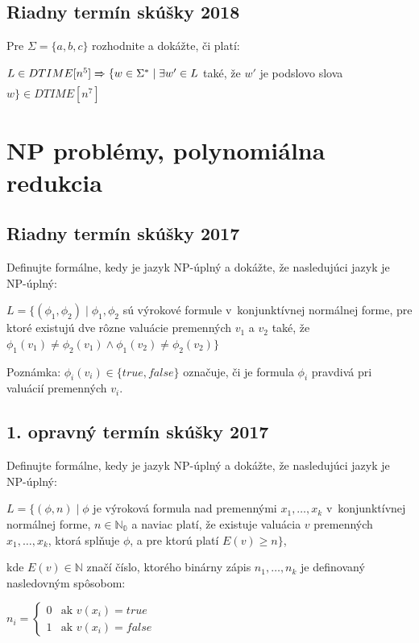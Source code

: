 \documentclass[11pt,a4paper]{article}
\begin{document}
		\subsection{Riadny termín skúšky 2018}

		Pre $\Sigma = \{a,b,c\}$ rozhodnite a dokážte, či platí:

		$L \in DTIME[n^5] \xRightarrow[]{} \{ w \in \Sigma^* \mid \exists w' \in L$ také, že $w'$ je podslovo slova $w\} \in DTIME[n^7]$

	\section{NP problémy, polynomiálna redukcia}

		\subsection{Riadny termín skúšky 2017}

		Definujte formálne, kedy je jazyk NP-úplný a dokážte, že nasledujúci jazyk je NP-úplný:

		$L = \{(\phi_1, \phi_2) \mid \phi_1, \phi_2$ sú výrokové formule v~konjunktívnej normálnej forme, pre ktoré existujú dve rôzne valuácie premenných $v_1$ a $v_2$ také, že $\phi_1(v_1) \neq \phi_2(v_1) \land \phi_1(v_2) \neq \phi_2(v_2)\}$

		Poznámka: $\phi_i(v_i) \in \{true, false\}$ označuje, či je formula $\phi_i$ pravdivá pri valuácií premenných $v_i$.

		\subsection{1. opravný termín skúšky 2017}

		Definujte formálne, kedy je jazyk NP-úplný a dokážte, že nasledujúci jazyk je NP-úplný:

		$L = \{(\phi, n) \mid \phi$ je výroková formula nad premennými $x_1, \ldots, x_k$ v~konjunktívnej normálnej forme, $n \in \mathbb{N_0}$ a naviac platí, že existuje valuácia $v$ premenných $x_1, \ldots, x_k$, ktorá splňuje $\phi$, a pre ktorú platí $E(v) \geq n\}$,

		kde $E(v) \in \mathbb{N}$ značí číslo, ktorého binárny zápis $n_1, \ldots, n_k$ je definovaný nasledovným spôsobom:

		$n_i =
		\left\{
		\begin{array}{ll}
			0  & \mbox{ak } v(x_i) = true \\
			1 & \mbox{ak } v(x_i) = false
		\end{array}
		\right.$
\end{document}
